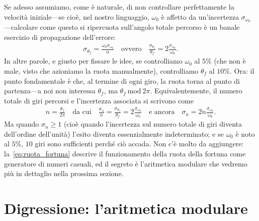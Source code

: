 Se adesso assumiamo, come è naturale, di non controllare perfettamente la
velocità iniziale---se cioè, nel nostro linguaggio, $\omega_0$ è affetto
da un'incertezza $\sigma_{\omega_0}$---calcolare come questo si ripercuota
sull'angolo totale percorso è un banale esercizio di propagazione dell'errore:
\begin{align*}
  \sigma_{\theta_f} = \frac{\omega_0 \sigma_{\omega_0}}{\alpha} \quad \text{ovvero} \quad
  \frac{\sigma_{\theta_f}}{\theta_f} = 2\frac{\sigma_{\omega_0}}{\omega_0}.
\end{align*}
In altre parole, e giusto per fissare le idee, se controlliamo $\omega_0$ al
$5\%$ (che non è male, visto che azioniamo la ruota manualmente), controlliamo
$\theta_f$ al $10\%$. Ora: il punto fondamentale è che, al termine di ogni giro,
la ruota torna al punto di partenza---a noi non interessa $\theta_f$, ma
$\theta_f~\text{mod}~2\pi$. Equivalentemente, il numero totale di giri percorsi e
l'incertezza associata si scrivono come
\begin{align}\label{eq:ruota_fortuna}
  n = \frac{\theta_f}{2\pi} \quad \text{da cui} \quad
  \frac{\sigma_n}{n} = \frac{\sigma_{\theta_f}}{\theta_f} = 2\frac{\sigma_{\omega_0}}{\omega_0}
  \quad \text{e ancora} \quad \sigma_n = 2n \frac{\sigma_{\omega_0}}{\omega_0}.
\end{align}
Ma quando $\sigma_n \geq 1$ (cioè quando l'incertezza sul numero totale di giri
diventa dell'ordine dell'unità) l'esito diventa essenzialmente indeterminato;
e se $\omega_0$ è noto al $5\%$, $10$ giri sono sufficienti perché ciò accada.
Non c'è molto da aggiungere: la~\eqref{eq:ruota_fortuna} descrive il funzionamento
della ruota della fortuna come generatore di numeri casuali, ed il segreto è
l'aritmetica modulare che vedremo più in dettaglio nella prossima sezione.


\section{Digressione: l'aritmetica modulare}

